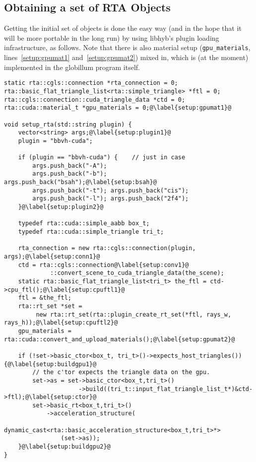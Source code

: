 \documentclass[a4paper,11pt]{scrartcl}
\begin{document}
\subsection{Obtaining a set of RTA Objects}
Getting the initial set of objects is done the easy way (and in the hope that it will be more portable in the long run)
	by using libhyb's plugin loading infrastructure, as follows.
Note that there is also material setup (\lstinline|gpu_materials|, lines~\ref{setup:gpumat1} and~\ref{setup:gpumat2}) mixed in, 
	which is (at the moment) implemented in the globillum program itself.

\begin{lstlisting}
static rta::cgls::connection *rta_connection = 0;
rta::basic_flat_triangle_list<rta::simple_triangle> *ftl = 0;
rta::cgls::connection::cuda_triangle_data *ctd = 0;
rta::cuda::material_t *gpu_materials = 0;@\label{setup:gpumat1}@

void setup_rta(std::string plugin) {
	vector<string> args;@\label{setup:plugin1}@
	plugin = "bbvh-cuda";

	if (plugin == "bbvh-cuda") {	// just in case
		args.push_back("-A");
		args.push_back("-b"); args.push_back("bsah");@\label{setup:bsah}@
		args.push_back("-t"); args.push_back("cis");
		args.push_back("-l"); args.push_back("2f4");
	}@\label{setup:plugin2}@

	typedef rta::cuda::simple_aabb box_t;
	typedef rta::cuda::simple_triangle tri_t;

	rta_connection = new rta::cgls::connection(plugin, args);@\label{setup:conn1}@
	ctd = rta::cgls::connection@\label{setup:conv1}@
	         ::convert_scene_to_cuda_triangle_data(the_scene);
	static rta::basic_flat_triangle_list<tri_t> the_ftl = ctd->cpu_ftl();@\label{setup:cpuftl1}@
	ftl = &the_ftl;
	rta::rt_set *set = 
		 new rta::rt_set(rta::plugin_create_rt_set(*ftl, rays_w, rays_h));@\label{setup:cpuftl2}@
	gpu_materials = rta::cuda::convert_and_upload_materials();@\label{setup:gpumat2}@

	if (!set->basic_ctor<box_t, tri_t>()->expects_host_triangles()) {@\label{setup:buildgpu1}@
		// the c'tor expects the triangle data on the gpu.
		set->as = set->basic_ctor<box_t,tri_t>()
		             ->build((tri_t::input_flat_triangle_list_t*)&ctd->ftl);@\label{setup:ctor}@
		set->basic_rt<box_t,tri_t>()
		    ->acceleration_structure(
				dynamic_cast<rta::basic_acceleration_structure<box_t,tri_t>*>
				(set->as));
	}@\label{setup:buildgpu2}@
}
\end{lstlisting}
\end{document}
